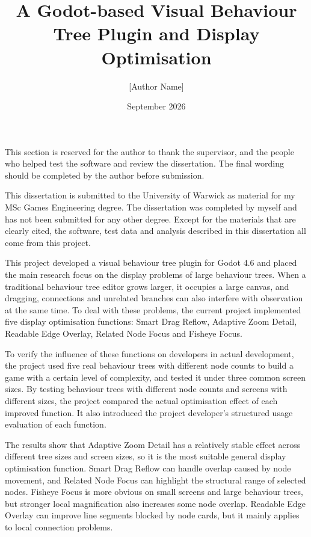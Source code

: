 \documentclass[11pt,a4paper,oneside,extrafontsizes]{memoir}
\title{A Godot-based Visual Behaviour Tree Plugin and Display Optimisation}
\author{[Author Name]}
\date{September 2026}
\begin{document}
\frontmatter
{}
\tableofcontents
\clearforchapter\listoffigures
\clearforchapter\listoftables


This section is reserved for the author to thank the supervisor, and the people who helped test the software and review the dissertation. The final wording should be completed by the author before submission.


This dissertation is submitted to the University of Warwick as material for my MSc Games Engineering degree. The dissertation was completed by myself and has not been submitted for any other degree. Except for the materials that are clearly cited, the software, test data and analysis described in this dissertation all come from this project.


This project developed a visual behaviour tree plugin for Godot 4.6 and placed the main research focus on the display problems of large behaviour trees. When a traditional behaviour tree editor grows larger, it occupies a large canvas, and dragging, connections and unrelated branches can also interfere with observation at the same time. To deal with these problems, the current project implemented five display optimisation functions: Smart Drag Reflow, Adaptive Zoom Detail, Readable Edge Overlay, Related Node Focus and Fisheye Focus.

To verify the influence of these functions on developers in actual development, the project used five real behaviour trees with different node counts to build a game with a certain level of complexity, and tested it under three common screen sizes. By testing behaviour trees with different node counts and screens with different sizes, the project compared the actual optimisation effect of each improved function. It also introduced the project developer's structured usage evaluation of each function.

The results show that Adaptive Zoom Detail has a relatively stable effect across different tree sizes and screen sizes, so it is the most suitable general display optimisation function. Smart Drag Reflow can handle overlap caused by node movement, and Related Node Focus can highlight the structural range of selected nodes. Fisheye Focus is more obvious on small screens and large behaviour trees, but stronger local magnification also increases some node overlap. Readable Edge Overlay can improve line segments blocked by node cards, but it mainly applies to local connection problems.
\end{document}
